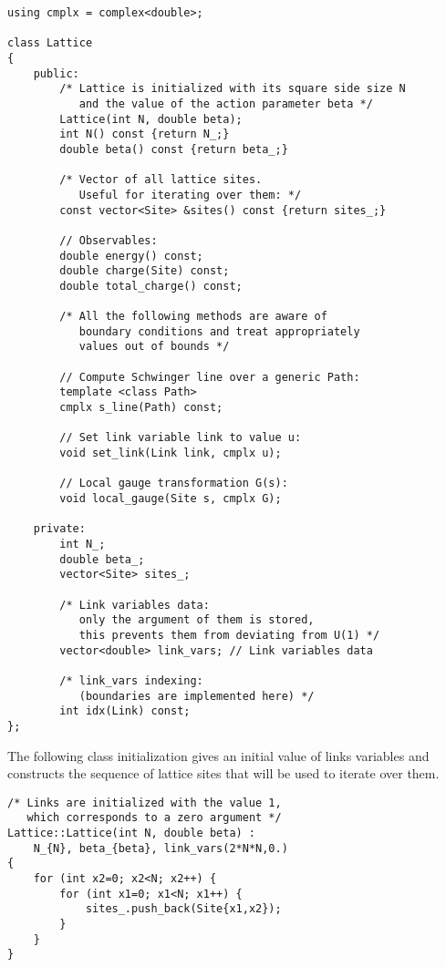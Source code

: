 \begin{lstlisting}[caption={Lattice class}]
using cmplx = complex<double>;

class Lattice
{
    public:
        /* Lattice is initialized with its square side size N
           and the value of the action parameter beta */
        Lattice(int N, double beta);
        int N() const {return N_;}
        double beta() const {return beta_;}
        
        /* Vector of all lattice sites.
           Useful for iterating over them: */
        const vector<Site> &sites() const {return sites_;}
        
        // Observables: 
        double energy() const;
        double charge(Site) const;
        double total_charge() const;
        
        /* All the following methods are aware of
           boundary conditions and treat appropriately
           values out of bounds */
        
        // Compute Schwinger line over a generic Path:
        template <class Path>
        cmplx s_line(Path) const;
        
        // Set link variable link to value u:
        void set_link(Link link, cmplx u);
        
        // Local gauge transformation G(s):
        void local_gauge(Site s, cmplx G);
        
    private:
        int N_;
        double beta_;
        vector<Site> sites_;

        /* Link variables data:
           only the argument of them is stored,
           this prevents them from deviating from U(1) */
        vector<double> link_vars; // Link variables data
        
        /* link_vars indexing:
           (boundaries are implemented here) */
        int idx(Link) const;
};
\end{lstlisting}

The following class initialization gives an initial value of links variables and constructs the sequence of lattice sites that will be used to iterate over them.

\begin{lstlisting}[caption={Lattice constructor}]
/* Links are initialized with the value 1,
   which corresponds to a zero argument */
Lattice::Lattice(int N, double beta) :
    N_{N}, beta_{beta}, link_vars(2*N*N,0.)
{
    for (int x2=0; x2<N; x2++) {
        for (int x1=0; x1<N; x1++) {
            sites_.push_back(Site{x1,x2});
        }
    }
}
\end{lstlisting}

